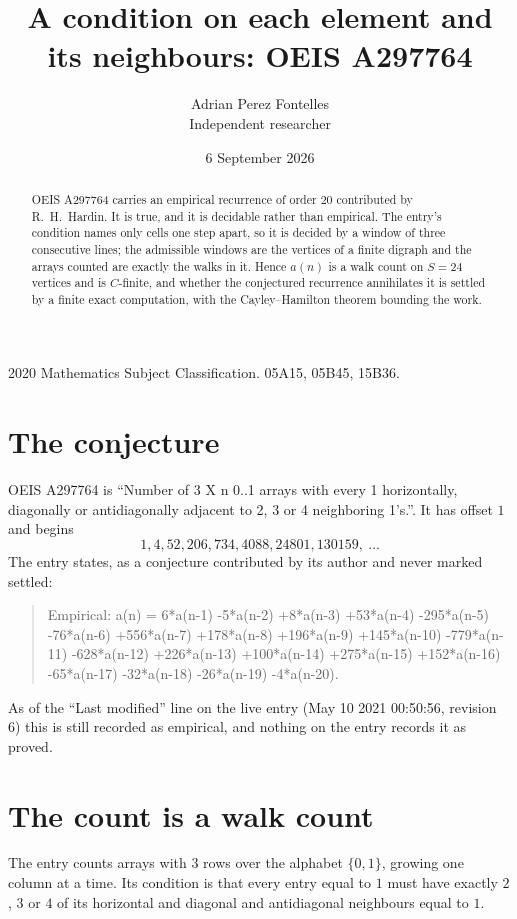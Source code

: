 \documentclass[11pt,a4paper]{article}
\title{A condition on each element and its neighbours: OEIS A297764}
\author{Adrian Perez Fontelles\\ \small Independent researcher}
\date{6 September 2026}
\theoremstyle{plain}
\theoremstyle{definition}
\begin{document}
\maketitle

\begin{abstract}
OEIS A297764 carries an empirical recurrence of order $20$ contributed by R.~H.~Hardin. It is
true, and it is decidable rather than empirical. The entry's condition names only cells one step apart, so it is decided by a window of
three consecutive lines; the
admissible windows are the vertices of a finite digraph and the arrays counted are exactly the
walks in it. Hence $a(n)$ is a walk count on $S=24$ vertices and is $C$-finite, and whether the
conjectured recurrence annihilates it is settled by a finite exact computation, with the
Cayley--Hamilton theorem bounding the work.
\end{abstract}

\noindent\small 2020 Mathematics Subject Classification. 05A15, 05B45, 15B36.\normalsize

\section{The conjecture}

OEIS A297764 is ``Number of 3 X n 0..1 arrays with every 1 horizontally, diagonally or antidiagonally adjacent to 2, 3 or 4 neighboring 1's.''. It has offset $1$ and begins
\[
1, 4, 52, 206, 734, 4088, 24801, 130159,\ \dots
\]
The entry states, as a conjecture contributed by its author and never marked settled:
\begin{quote}
Empirical: a(n) = 6*a(n-1) -5*a(n-2) +8*a(n-3) +53*a(n-4) -295*a(n-5) -76*a(n-6) +556*a(n-7) +178*a(n-8) +196*a(n-9) +145*a(n-10) -779*a(n-11) -628*a(n-12) +226*a(n-13) +100*a(n-14) +275*a(n-15) +152*a(n-16) -65*a(n-17) -32*a(n-18) -26*a(n-19) -4*a(n-20).
\end{quote}
As of the ``Last modified'' line on the live entry (May 10 2021 00:50:56, revision 6) this is still
recorded as empirical, and nothing on the entry records it as proved.

\section{The count is a walk count}

The entry counts arrays with $3$ rows over the alphabet $\{0,1\}$, growing one column at a time. Its condition is that every entry equal to $1$ must have exactly $2$, $3$ or $4$ of its horizontal and diagonal and antidiagonal neighbours equal to $1$.
\end{document}

